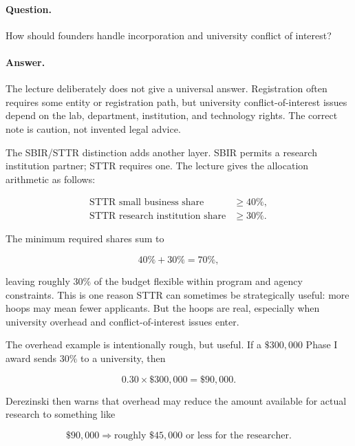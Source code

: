 \paragraph{Question.}
How should founders handle incorporation and university conflict of interest?

\paragraph{Answer.}
The lecture deliberately does not give a universal answer. Registration often requires some entity or registration path, but university conflict-of-interest issues depend on the lab, department, institution, and technology rights. The correct note is caution, not invented legal advice.

The SBIR/STTR distinction adds another layer. SBIR permits a research institution partner; STTR requires one. The lecture gives the allocation arithmetic as follows:

\begin{align}
\text{STTR small business share} &\ge 40\%,\\
\text{STTR research institution share} &\ge 30\%.
\end{align}

The minimum required shares sum to

\begin{equation}
40\%+30\%=70\%,
\end{equation}

leaving roughly \(30\%\) of the budget flexible within program and agency constraints. This is one reason STTR can sometimes be strategically useful: more hoops may mean fewer applicants. But the hoops are real, especially when university overhead and conflict-of-interest issues enter.

The overhead example is intentionally rough, but useful. If a \(\$300{,}000\) Phase I award sends \(30\%\) to a university, then

\begin{equation}
0.30\times \$300{,}000=\$90{,}000.
\end{equation}

Derezinski then warns that overhead may reduce the amount available for actual research to something like

\begin{equation}
\$90{,}000
\Rightarrow
\text{roughly }\$45{,}000\text{ or less for the researcher.}
\end{equation}

